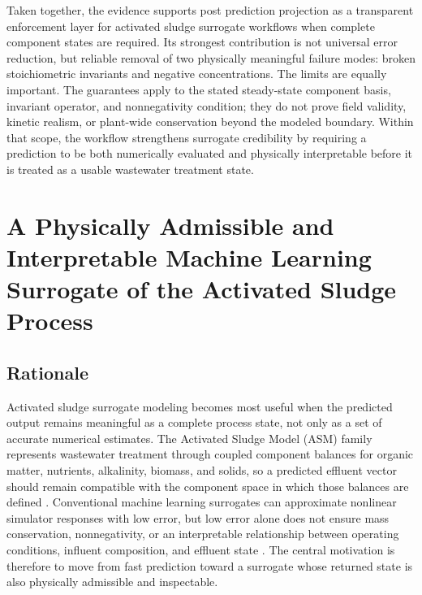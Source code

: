 \documentclass[12pt, twoside]{book}
\begin{document}
Taken together, the evidence supports post prediction projection as a transparent enforcement layer for
activated sludge surrogate workflows when complete component states are required. Its strongest contribution is
not universal error reduction, but reliable removal of two physically meaningful failure modes: broken
stoichiometric invariants and negative concentrations. The limits are equally important. The guarantees apply
to the stated steady-state component basis, invariant operator, and nonnegativity condition; they do not prove
field validity, kinetic realism, or plant-wide conservation beyond the modeled boundary. Within that scope, the
workflow strengthens surrogate credibility by requiring a prediction to be both numerically evaluated and
physically interpretable before it is treated as a usable wastewater treatment state.


\chapter{A Physically Admissible and Interpretable Machine Learning Surrogate of the Activated Sludge Process}
\label{ch:admissible}

\section{Rationale}

Activated sludge surrogate modeling becomes most useful when the predicted output remains meaningful as a
complete process state, not only as a set of accurate numerical estimates. The Activated Sludge Model (ASM)
family represents wastewater treatment through coupled component balances for organic matter, nutrients,
alkalinity, biomass, and solids, so a predicted effluent vector should remain compatible with the component
space in which those balances are defined \citep{Henze2006,Guerrero2011}. Conventional machine learning
surrogates can approximate nonlinear simulator responses with low error, but low error alone does not ensure
mass conservation, nonnegativity, or an interpretable relationship between operating conditions, influent
composition, and effluent state \citep{Hansen2024,KircherVotsmeier2025,Shen2023}. The central motivation is
therefore to move from fast prediction toward a surrogate whose returned state is also physically admissible
and inspectable.
\end{document}
